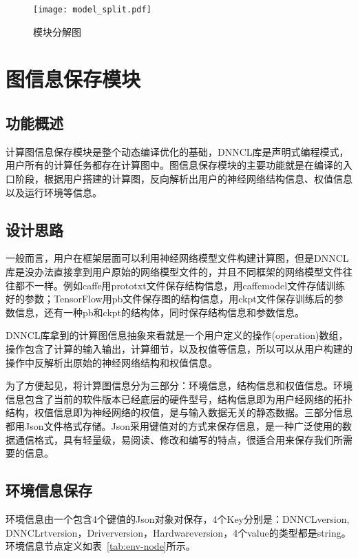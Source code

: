\begin{figure}[htb]
  \centering
  \texttt{[image: model\_split.pdf]}
  \caption{模块分解图}
  \label{fig:model-split}
\end{figure}

\section {图信息保存模块}
\subsection {功能概述}
计算图信息保存模块是整个动态编译优化的基础，DNNCL库是声明式编程模式，用户所有的计算任务都存在计算图中。图信息保存模块的主要功能就是在编译的入口阶段，根据用户搭建的计算图，反向解析出用户的神经网络结构信息、权值信息以及运行环境等信息。

\subsection {设计思路}
一般而言，用户在框架层面可以利用神经网络模型文件构建计算图，但是DNNCL库是没办法直接拿到用户原始的网络模型文件的，并且不同框架的网络模型文件往往都不一样。例如caffe用prototxt文件保存结构信息，用caffemodel文件存储训练好的参数；TensorFlow用pb文件保存图的结构信息，用ckpt文件保存训练后的参数信息，还有一种pb和ckpt的结构体，同时保存结构信息和参数信息。

DNNCL库拿到的计算图信息抽象来看就是一个用户定义的操作(operation)数组，操作包含了计算的输入输出，计算细节，以及权值等信息，所以可以从用户构建的操作中反解析出原始的神经网络结构和权值信息。

为了方便起见，将计算图信息分为三部分：环境信息，结构信息和权值信息。环境信息包含了当前的软件版本已经底层的硬件型号，结构信息即为用户经网络的拓扑结构，权值信息即为神经网络的权值，是与输入数据无关的静态数据。三部分信息都用Json文件格式存储。Json采用键值对的方式来保存信息，是一种广泛使用的数据通信格式，具有轻量级，易阅读、修改和编写的特点，很适合用来保存我们所需要的信息。

\subsection {环境信息保存}
环境信息由一个包含4个键值的Json对象对保存，4个Key分别是：DNNCLversion, DNNCLrtversion，Driverversion，Hardwareversion，4个value的类型都是string。环境信息节点定义如表~\ref{tab:env-node}所示。

